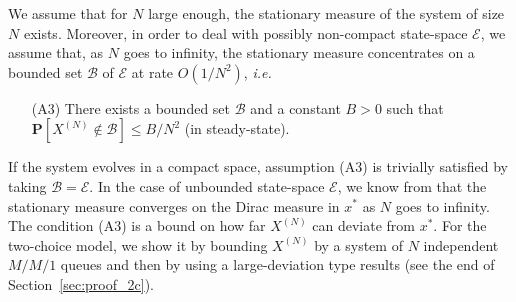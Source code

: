 \documentclass[acmlarge]{acmart}
\newcommand\XN{X^{(N)}}
\newcommand\E{\mathcal{E}}
\newcommand\calB{\mathcal{B}}
\newcommand\sProba[1]{\mathbf{P}[#1]}
\begin{document}
We assume that for $N$ large enough, the stationary measure of the
system of size $N$ exists. Moreover, in order to deal with possibly
non-compact state-space $\E$, we assume that, as $N$ goes to infinity,
the stationary measure concentrates on a bounded set $\calB$ of $\E$
at rate $O(1/N^2)$, \emph{i.e.}
\begin{itemize}
\item[(A3)] There exists a bounded set $\calB$ and a constant $B>0$
  such that $\sProba{\XN\not\in\calB}\le B/N^2$ (in steady-state). 
\end{itemize}
If the system evolves in a compact space, assumption (A3) is trivially
satisfied by taking $\calB=\E$. In the case of unbounded state-space
$\E$, we know from \cite{benaim2008class} that the stationary measure
converges on the Dirac measure in $x^*$ as $N$ goes to infinity. The
condition (A3) is a bound on how far $\XN$ can deviate from $x^*$.
For the two-choice model, we show it by bounding $\XN$ by a system of
$N$ independent $M/M/1$ queues and then by using a large-deviation
type results (see the end of Section~\ref{sec:proof_2c}).
\end{document}
